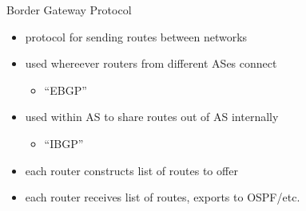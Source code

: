 \begin{frame}{Border Gateway Protocol}
    \begin{itemize}
    \item protocol for sending routes between networks
    \item used whereever routers from different ASes connect
        \begin{itemize}
        \item ``EBGP''
        \end{itemize}
    \item used within AS to share routes out of AS internally
        \begin{itemize}
        \item ``IBGP''
        \end{itemize}
    \vspace{.5cm}
    \item each router constructs list of routes to offer
    \item each router receives list of routes, exports to OSPF/etc.
    \end{itemize}
\end{frame}
